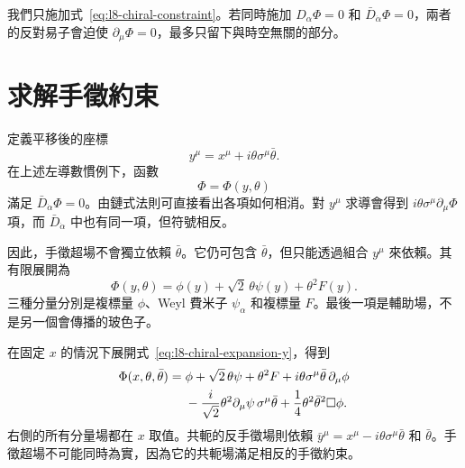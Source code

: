 \begin{classroomqa}
\end{classroomqa}

我們只施加式~\eqref{eq:l8-chiral-constraint}。若同時施加 \(D_\alpha\Phi=0\) 和 \(\bar D_{\dot\alpha}\Phi=0\)，兩者的反對易子會迫使 \(\partial_\mu\Phi=0\)，最多只留下與時空無關的部分。

\section{求解手徵約束}

定義平移後的座標
\begin{equation}
y^\mu=x^\mu+i\theta\sigma^\mu\bar\theta.
\label{eq:l8-chiral-coordinate}
\end{equation}
在上述左導數慣例下，函數
\begin{equation}
\Phi=\Phi(y,\theta)
\label{eq:l8-chiral-solution}
\end{equation}
滿足 \(\bar D_{\dot\alpha}\Phi=0\)。由鏈式法則可直接看出各項如何相消。對 \(y^\mu\) 求導會得到 \(i\theta\sigma^\mu\partial_\mu\Phi\) 項，而 \(\bar D_{\dot\alpha}\) 中也有同一項，但符號相反。

因此，手徵超場不會獨立依賴 \(\bar\theta\)。它仍可包含 \(\bar\theta\)，但只能透過組合 \(y^\mu\) 來依賴。其有限展開為
\begin{equation}
\Phi(y,\theta)
=\phi(y)+\sqrt2\,\theta\psi(y)+\theta^2F(y).
\label{eq:l8-chiral-expansion-y}
\end{equation}
三種分量分別是複標量 \(\phi\)、Weyl 費米子 \(\psi_\alpha\) 和複標量 \(F\)。最後一項是輔助場，不是另一個會傳播的玻色子。

\begin{classroomqa}
\end{classroomqa}

在固定 \(x\) 的情況下展開式~\eqref{eq:l8-chiral-expansion-y}，得到
\begin{align}
\Phi(x,\theta,\bar\theta)
={}&\phi
+\sqrt2\,\theta\psi
+\theta^2F
+i\theta\sigma^\mu\bar\theta\,\partial_\mu\phi
\notag\\
&-\frac{i}{\sqrt2}\theta^2
\partial_\mu\psi\,\sigma^\mu\bar\theta
+\frac14\theta^2\bar\theta^2\Box\phi.
\label{eq:l8-chiral-expansion-x}
\end{align}
右側的所有分量場都在 \(x\) 取值。共軛的反手徵場則依賴
\(\bar y^\mu=x^\mu-i\theta\sigma^\mu\bar\theta\) 和 \(\bar\theta\)。手徵超場不可能同時為實，因為它的共軛場滿足相反的手徵約束。

